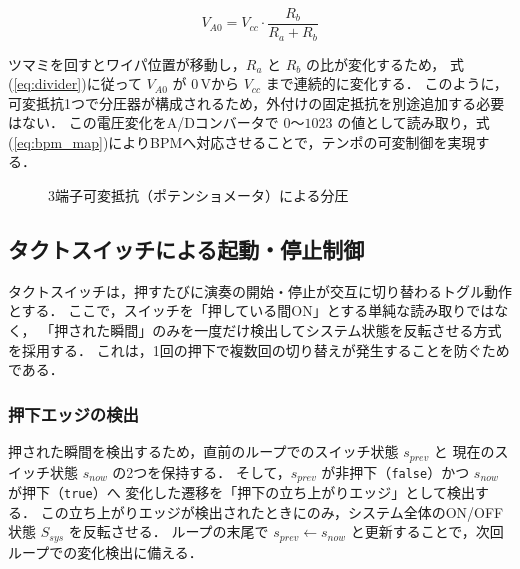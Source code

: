 \documentclass[lualatex,book,openany,paper=a4paper,jafontsize=11.5pt,jafontscale=1.05]{jlreq}
\begin{document}
\begin{equation}
  V_{A0} = V_{cc} \cdot \frac{R_{b}}{R_{a} + R_{b}}
  \label{eq:divider}
\end{equation}

ツマミを回すとワイパ位置が移動し，$R_{a}$ と $R_{b}$ の比が変化するため，
式(\ref{eq:divider})に従って $V_{A0}$ が $0$\,Vから $V_{cc}$ まで連続的に変化する．
このように，可変抵抗1つで分圧器が構成されるため，外付けの固定抵抗を別途追加する必要はない．
この電圧変化をA/Dコンバータで $0$〜$1023$ の値として読み取り，式(\ref{eq:bpm_map})によりBPMへ対応させることで，テンポの可変制御を実現する．

\begin{figure}[H]
  \centering
  \caption{3端子可変抵抗（ポテンショメータ）による分圧}
  \label{fig:voltage_divider}
\end{figure}

\subsection{タクトスイッチによる起動・停止制御}
タクトスイッチは，押すたびに演奏の開始・停止が交互に切り替わるトグル動作とする．
ここで，スイッチを「押している間ON」とする単純な読み取りではなく，
「押された瞬間」のみを一度だけ検出してシステム状態を反転させる方式を採用する．
これは，1回の押下で複数回の切り替えが発生することを防ぐためである．

\subsubsection{押下エッジの検出}
押された瞬間を検出するため，直前のループでのスイッチ状態 $s_{prev}$ と
現在のスイッチ状態 $s_{now}$ の2つを保持する．
そして，$s_{prev}$ が非押下（\texttt{false}）かつ $s_{now}$ が押下（\texttt{true}）へ
変化した遷移を「押下の立ち上がりエッジ」として検出する．
この立ち上がりエッジが検出されたときにのみ，システム全体のON/OFF状態 $S_{sys}$ を反転させる．
ループの末尾で $s_{prev} \leftarrow s_{now}$ と更新することで，次回ループでの変化検出に備える．
\end{document}
